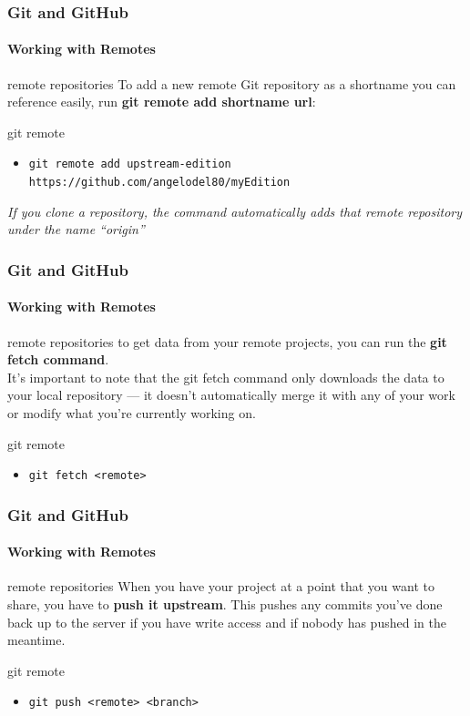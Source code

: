\begin{frame}
	\frametitle{Git and GitHub}
    \framesubtitle{Working with Remotes}
    \addtocounter{nframe}{1}

	\begin{block}{remote repositories}
		To add a new remote Git repository as a shortname you can reference easily, run \textbf{git remote add shortname url}:
	\end{block}

	\begin{block}{git remote}
		\begin{itemize}
			\item \texttt{git remote add upstream-edition https://github.com/angelodel80/myEdition}
		\end{itemize}
	\end{block}

	\textit{If you clone a repository, the command automatically adds that remote repository under the name “origin”}

\end{frame}

\begin{frame}
	\frametitle{Git and GitHub}
    \framesubtitle{Working with Remotes}
    \addtocounter{nframe}{1}

	\begin{block}{remote repositories}
		to get data from your remote projects, you can run the \textbf{git fetch command}. \\
		It’s important to note that the git fetch command only downloads the data to your local repository — it doesn't automatically merge it with any of your work or modify what you’re currently working on.
	\end{block}

	\begin{block}{git remote}
		\begin{itemize}
			\item \texttt{git fetch <remote>}
		\end{itemize}
	\end{block}

\end{frame}

\begin{frame}
	\frametitle{Git and GitHub}
    \framesubtitle{Working with Remotes}
    \addtocounter{nframe}{1}

	\begin{block}{remote repositories}
		When you have your project at a point that you want to share, you have to \textbf{push it upstream}. This pushes any commits you’ve done back up to the server if you have write access and if nobody has pushed in the meantime.
	\end{block}

	\begin{block}{git remote}
		\begin{itemize}
			\item \texttt{git push <remote> <branch>}
		\end{itemize}
	\end{block}

\end{frame}

